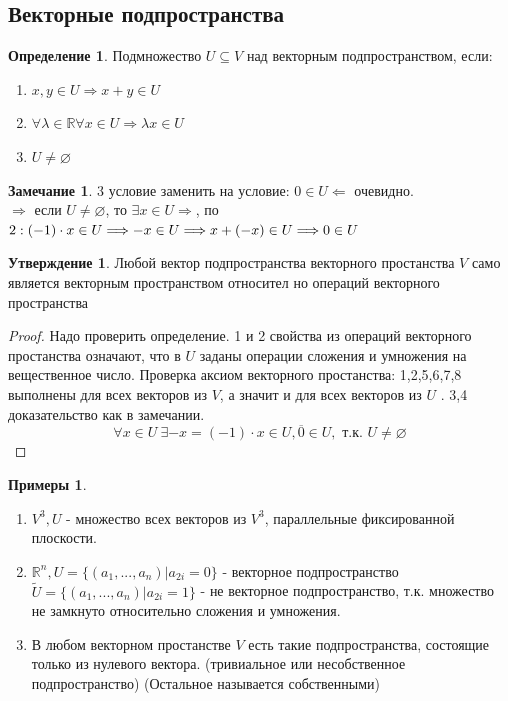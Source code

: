 \documentclass[a4paper, 12pt]{article}
\newcommand{\R}{\mathbb R}
\theoremstyle{definition}
\newtheorem*{definition}{Определение}
\newtheorem*{subtheorem}{Утверждение}
\newtheorem*{remark}{Замечание}
\newtheorem*{example}{Примеры}
\begin{document}
  \subsection{Векторные подпространства}
  \begin{definition}
    Подмножество $U\subseteq V$ над векторным подпространством, если:
    \begin{enumerate}
      \item $ x, y \in U \Longrightarrow  x + y \in U$ 
      \item $\forall \lambda \in \R \forall x \in U \Longrightarrow \lambda x \in U$ 
      \item $U \neq \varnothing$ 
    \end{enumerate}
  \end{definition} 
  \begin{remark}
    3 условие заменить на условие: $0 \in  U \Longleftarrow$ очевидно. \\
    $\Longrightarrow$ если $U \neq \varnothing$, то $\exists x \in U \Longrightarrow$, по $2: (-1) \cdot x \in U \Longrightarrow -x \in U \\ \Longrightarrow x + (-x) \in U \Longrightarrow 0 \in U$     
  \end{remark} 
  \begin{subtheorem}
    Любой вектор подпространства векторного простанства $V$ само является векторным пространством относител но операций векторного пространства 
  \end{subtheorem} 
  \begin{proof}
    Надо проверить определение. 1 и 2 свойства из операций векторного простанства означают, что в $U$ заданы операции сложения и умножения на вещественное число. Проверка аксиом векторного простанства: 1,2,5,6,7,8 выполнены для всех векторов из $V$, а значит и для всех векторов из $U$ . 3,4 доказательство как в замечании. 
    $$\forall x \in U \ \exists -x = (-1) \cdot x \in U,  \overline{0} \in U, \text{ т.к. } U \neq \varnothing $$   
  \end{proof} 
  \begin{example}
    \begin{enumerate}
      \item $V^3, U$ - множество всех векторов из $V^3$, параллельные фиксированной плоскости.
      \item $\R^n, U=\{(a_1,..., a_n) | a_{2i} = 0\}$ - векторное подпространство \\ $\widetilde{U} = \{(a_1,..., a_n) | a_{2i} = 1\}$ - не векторное подпространство, т.к. множество не замкнуто относительно сложения и умножения.
      \item В любом векторном простанстве $V$ есть такие подпространства, состоящие только из нулевого вектора. (тривиальное или несобственное подпространство) (Остальное называется собственными)
    \end{enumerate}
  \end{example}
  \newpage
\end{document}
